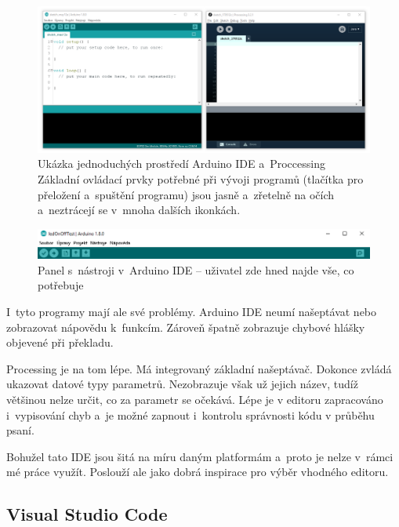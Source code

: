\begin{figure}[h]
    \centering
    \includegraphics[width=\textwidth]{images/arduino+processing.png}
    \caption[Ukázka jednoduchých prostředí Arduino IDE a~Proccessing]{Ukázka jednoduchých prostředí Arduino IDE a~Proccessing \\
    Základní ovládací prvky potřebné při vývoji programů (tlačítka pro přeložení a~spuštění programu) jsou jasně a~zřetelně na očích a~neztrácejí se v~mnoha dalších ikonkách.}
    \label{fig:arduino+processing}
\end{figure}

\begin{figure}[h]
    \centering
    \includegraphics[width=\textwidth]{images/arduino-ide_tools-panel.png}
    \caption{Panel s~nástroji v~Arduino IDE -- uživatel zde hned najde vše, co potřebuje}
    \label{fig:arduino-ide_tools-panel}
\end{figure}

I~tyto programy mají ale své problémy. 
Arduino IDE neumí našeptávat nebo zobrazovat nápovědu k~funkcím. 
Zároveň špatně zobrazuje chybové hlášky objevené při překladu.

Processing je na tom lépe. 
Má integrovaný základní našeptávač. 
Dokonce zvládá ukazovat datové typy parametrů.
Nezobrazuje však už jejich název, tudíž většinou nelze určit, co za parametr se očekává.
Lépe je v editoru zapracováno i~vypisování chyb a~je možné zapnout i~kontrolu správnosti kódu v průběhu psaní.

Bohužel tato IDE jsou šitá na míru daným platformám a~proto je nelze v~rámci mé práce využít. 
Poslouží ale jako dobrá inspirace pro výběr vhodného editoru.

\subsection{Visual Studio Code}


